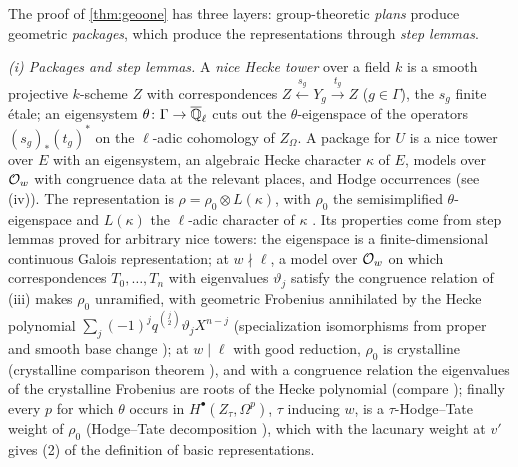 \begin{proofoutline}
The proof of \cref{thm:geoone} has three layers: group-theoretic \emph{plans} produce geometric
\emph{packages}, which produce the representations through \emph{step lemmas}.

\emph{(i) Packages and step lemmas.} A \emph{nice Hecke tower} over a field $k$ is a smooth projective
$k$-scheme $Z$ with correspondences $Z\xleftarrow{s_g}Y_g\xrightarrow{t_g}Z$ ($g\in\Gamma$), the $s_g$
finite \'etale; an eigensystem $\theta\colon\Gamma\to\overline{\mathbb{Q}}_\ell$ cuts out the $\theta$-eigenspace of the
operators $(s_g)_*(t_g)^*$ on the $\ell$-adic cohomology of $Z_\Omega$. A package for $U$ is a nice tower
over $E$ with an eigensystem, an algebraic Hecke character $\kappa$ of $E$, models over $\mathcal{O}_w$ with
congruence data at the relevant places, and Hodge occurrences (see (iv)).
The representation is $\rho=\rho_0\otimes L(\kappa)$, with $\rho_0$ the semisimplified
$\theta$-eigenspace and $L(\kappa)$ the $\ell$-adic character of $\kappa$ \cite{Serre1968}. Its
properties come from step lemmas proved for arbitrary nice towers: the eigenspace is a
finite-dimensional continuous Galois representation; at $w\nmid\ell$, a model over $\mathcal{O}_w$ on which
correspondences $T_0,\dots,T_n$ with eigenvalues $\vartheta_j$ satisfy the congruence relation of (iii)
makes $\rho_0$ unramified, with geometric Frobenius annihilated by the Hecke polynomial
$\sum_j(-1)^jq^{\binom j2}\vartheta_jX^{n-j}$ (specialization isomorphisms from proper and smooth base
change \cite{ArtinGrothendieckVerdier1972}); at $w\mid\ell$ with good reduction, $\rho_0$ is
crystalline (crystalline comparison theorem
\cite{FontaineMessing1987,Faltings1989,Tsuji1999,BhattMorrowScholze2018}), and with a congruence
relation the eigenvalues of the crystalline Frobenius are roots of the Hecke polynomial (compare
\cite{KatzMessing1974}); finally every $p$ for which $\theta$ occurs in $H^\bullet(Z_\tau,\Omega^p)$, $\tau$
inducing $w$, is a $\tau$-Hodge--Tate weight of $\rho_0$ (Hodge--Tate decomposition
\cite{Faltings1988,Scholze2013phodge}), which with the lacunary weight at $v'$ gives (2) of the
definition of basic representations.


\end{proofoutline}
